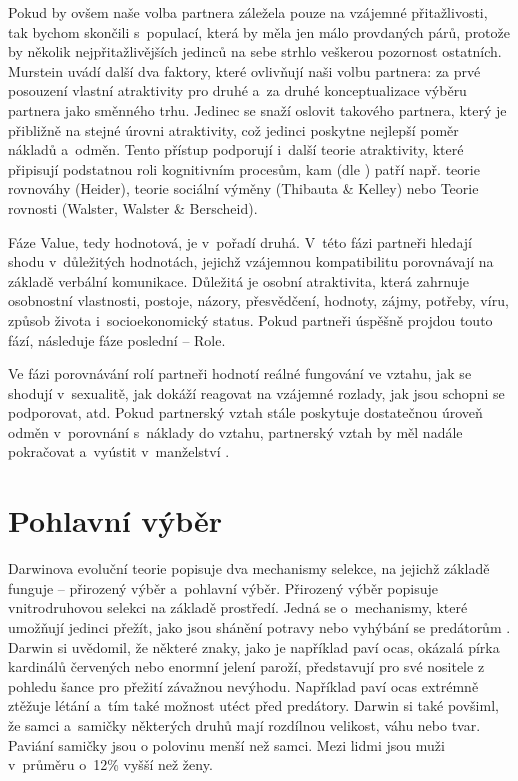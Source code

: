 \documentclass[a4paper, 12pt, notitlepage, oneside, numbers=noenddot]{report}
\begin{document}
Pokud by ovšem naše volba partnera záležela pouze na vzájemné
přitažlivosti, tak bychom skončili s~populací, která by měla jen málo
provdaných párů, protože by několik nejpřitažlivějších jedinců na sebe
strhlo veškerou pozornost ostatních.  Murstein uvádí další dva
faktory, které ovlivňují naši volbu partnera: za prvé posouzení
vlastní at\-rak\-ti\-vi\-ty pro druhé a~za druhé konceptualizace výběru
partnera jako směnného trhu. Jedinec se snaží oslovit takového
partnera, který je přibližně na stejné úrovni atraktivity, což jedinci
poskytne nejlepší poměr nákladů a~odměn. Tento přístup podporují
i~další teorie atraktivity, které připisují podstatnou roli
kognitivním procesům, kam (dle \citealp{Slamenik2008}) patří
např. teorie rovnováhy (Heider), teorie sociální výměny (Thibauta \&
Kelley) nebo Teorie rovnosti (Walster, Walster \& Berscheid).

Fáze Value, tedy hodnotová, je v~pořadí druhá.  V~této fázi partneři
hledají shodu v~dů\-le\-ži\-tých hodnotách, jejichž vzájemnou
kompatibilitu porovnávají na základě verbální komunikace.  Důležitá je
osobní atraktivita, která zahrnuje osobnostní vlastnosti, postoje,
názory, přesvědčení, hodnoty, zájmy, potřeby, víru, způsob života
i~socioekonomický status.  Pokud partneři úspěšně projdou touto fází,
následuje fáze poslední -- Role.

Ve fázi porovnávání rolí partneři hodnotí reálné fungování ve vztahu,
jak se shodují v~sexualitě, jak dokáží reagovat na vzájemné rozlady,
jak jsou schopni se podporovat, atd.  Pokud partnerský vztah stále
poskytuje dostatečnou úroveň odměn v~porovnání s~náklady do vztahu,
partnerský vztah by měl nadále pokračovat a~vyústit v~manželství
\citep{Murstein1970}.

\section{Pohlavní výběr}
Darwinova evoluční teorie popisuje dva mechanismy selekce, na jejichž
základě funguje -- přirozený výběr a~pohlavní výběr.  Přirozený výběr
popisuje vnitrodruhovou selekci na základě prostředí.  Jedná se
o~mechanismy, které umožňují jedinci přežít, jako jsou shánění potravy
nebo vyhýbání se predátorům \citep{Darwin2005, Buss2007}.  Darwin si
uvědomil, že některé znaky, jako je například paví ocas, okázalá pírka
kardinálů červených nebo enormní jelení paroží, představují pro své
nositele z pohledu šance pro přežití závažnou nevýhodu.  Například paví
ocas extrémně ztěžuje létání a~tím také možnost utéct před predátory.
Darwin si také povšiml, že samci a~samičky některých druhů mají
rozdílnou velikost, váhu nebo tvar.  Paviání samičky jsou o polovinu
menší než samci.  Mezi lidmi jsou muži v~průměru o~12\% vyšší než
ženy.
\end{document}
